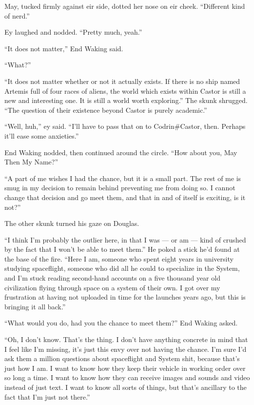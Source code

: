 May, tucked firmly against eir side, dotted her nose on eir cheek. ``Different kind of nerd.''

Ey laughed and nodded. ``Pretty much, yeah.''

``It does not matter,'' End Waking said.
 
``What?''
 
``It does not matter whether or not it actually exists. If there is no ship named Artemis full of four races of aliens, the world which exists within Castor is still a new and interesting one. It is still a world worth exploring.'' The skunk shrugged. ``The question of their existence beyond Castor is purely academic.''
 
``Well, huh,'' ey said. ``I'll have to pass that on to Codrin\#Castor, then. Perhaps it'll ease some anxieties.''
 
End Waking nodded, then continued around the circle. ``How about you, May Then My Name?''

``A part of me wishes I had the chance, but it is a small part. The rest of me is smug in my decision to remain behind preventing me from doing so. I cannot change that decision and go meet them, and that in and of itself is exciting, is it not?''

The other skunk turned his gaze on Douglas.

``I think I'm probably the outlier here, in that I was — or am — kind of crushed by the fact that I won't be able to meet them.''  He poked a stick he'd found at the base of the fire. ``Here I am, someone who spent eight years in university studying spaceflight, someone who did all he could to specialize in the System, and I'm stuck reading second-hand accounts on a five thousand year old civilization flying through space on a system of their own. I got over my frustration at having not uploaded in time for the launches years ago, but this is bringing it all back.''

``What would you do, had you the chance to meet them?'' End Waking asked.

``Oh, I don't know. That's the thing. I don't have anything concrete in mind that I feel like I'm missing, it's just this envy over not having the chance. I'm sure I'd ask them a million questions about spaceflight and System shit, because that's just how I am. I want to know how they keep their vehicle in working order over so long a time. I want to know how they can receive images and sounds and video instead of just text. I want to know all sorts of things, but that's ancillary to the fact that I'm just not there.''

